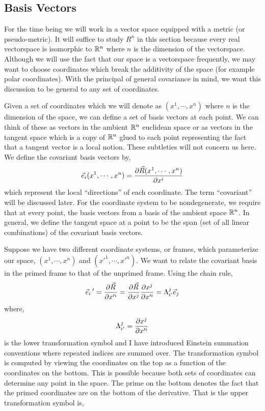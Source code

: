 \documentclass[11pt, a4paper]{article}
\begin{document}
\subsection{Basis Vectors}

For the time being we will work in a vector space equipped with a metric (or pseudo-metric). It will suffice to study $R^n$ in this section because every real vectorspace is isomorphic to $\mathbb{R}^n$ where $n$ is the dimension of the vectorspace. Although we will use the fact that our space is a vectorspace frequently, we may want to choose coordinates which break the additivity of the space (for example polar coordinates). With the principal of general covariance in mind, we want this discussion to be general to any set of coordinates. 
\par
Given a set of coordinates which we will denote as $(x^1, \cdots, x^n)$ where $n$ is the dimension of the space, we can define a set of basis vectors at each point. We can think of these as vectors in the ambient $\mathbb{R}^n$ euclidean space or as vectors in the tangent space which is a copy of $\mathbb{R}^n$ glued to each point representing the fact that a tangent vector is a local notion. These subtleties will not concern us here. We define the covariant basis vectors by,
\[ \vec{e}_i(x^1, \cdots, x^n) = \frac{\partial{\vec{R}(x^1, \cdots, x^n)}}{\partial{x^i}} \]
which represent the local ``directions'' of each coordinate. The term ``covariant'' will be discussed later. For the coordinate system to be nondegenerate, we require that at every point, the basis vectors from a basis of the ambient space $\mathbb{R}^n$. In general, we define the tangent space at a point to be the span (set of all linear combinations) of the covariant basis vectors.  
\par
Suppose we have two different coordinate systems, or frames, which parameterize our space, $(x^1, \cdots, x^n)$ and $(x'^1, \cdots, x'^n)$. We want to relate the covariant basis in the primed frame to that of the unprimed frame. Using the chain rule,
\[ \vec{e}_i{\, '} = \frac{\partial{\vec{R}}}{\partial{x'^i}} =  \frac{\partial{\vec{R}}}{\partial{x^j}} \frac{\partial{x^j}}{\partial{x'^i}} = \Lambda^j_{i'} \vec{e}_j \] 
where, 
\[\Lambda^j_{i'} = \frac{\partial{x^j}}{\partial{x'^i}}\]
is the lower transformation symbol and I have introduced Einstein summation conventions where repeated indices are summed over. The transformation symbol is computed by viewing the coordinates on the top as a function of the coordinates on the bottom. This is possible because both sets of coordinates can determine any point in the space. The prime on the bottom denotes the fact that the primed coordinates are on the bottom of the derivative. That is the upper transformation symbol is,
\end{document}
